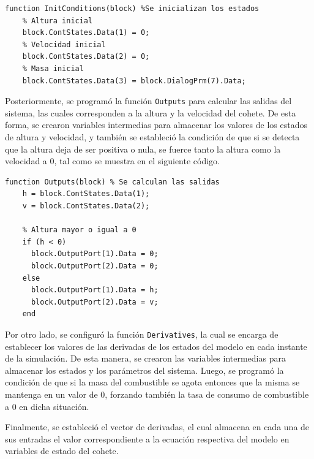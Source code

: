 \documentclass[12pt,letterpaper]{article}
\begin{document}
\begin{lstlisting}[style=Matlab-editor, basicstyle=\mlttfamily]
  function InitConditions(block) %Se inicializan los estados
    % Altura inicial
    block.ContStates.Data(1) = 0;
    % Velocidad inicial
    block.ContStates.Data(2) = 0;
    % Masa inicial
    block.ContStates.Data(3) = block.DialogPrm(7).Data;
\end{lstlisting}

Posteriormente, se programó la función \texttt{Outputs} para calcular las salidas del sistema, las
cuales corresponden a la altura y la velocidad del cohete. De esta forma, se crearon variables
intermedias para almacenar los valores de los estados de altura y velocidad, y también se estableció la
condición de que si se detecta que la altura deja de ser positiva o nula, se fuerce tanto la altura
como la velocidad a 0, tal como se muestra en el siguiente código.

\begin{lstlisting}[style=Matlab-editor, basicstyle=\mlttfamily]
  function Outputs(block) % Se calculan las salidas
    h = block.ContStates.Data(1);
    v = block.ContStates.Data(2);

    % Altura mayor o igual a 0
    if (h < 0)
      block.OutputPort(1).Data = 0;
      block.OutputPort(2).Data = 0;
    else
      block.OutputPort(1).Data = h;
      block.OutputPort(2).Data = v;
    end
\end{lstlisting}

Por otro lado, se configuró la función \texttt{Derivatives}, la cual se encarga de establecer los
valores de las derivadas de los estados del modelo en cada instante de la simulación. De esta
manera, se crearon las variables intermedias para almacenar los estados y los parámetros
del sistema. Luego, se programó la condición de que si la masa del combustible se agota entonces que
la misma se mantenga en un valor de 0, forzando también la tasa de consumo de combustible a 0 en
dicha situación.

Finalmente, se estableció el vector de derivadas, el cual almacena en cada una de sus entradas el
valor correspondiente a la ecuación respectiva del modelo en variables de estado del cohete.
\end{document}
